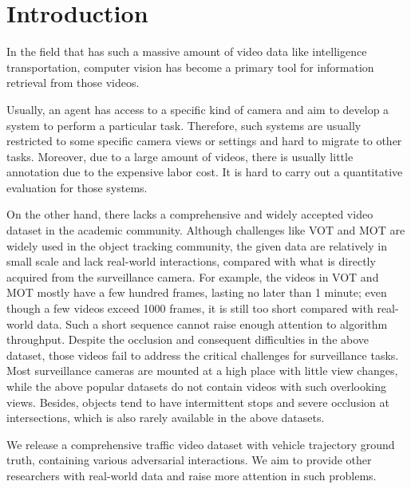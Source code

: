 \section{Introduction}

In the field that has such a massive amount of video data like intelligence transportation, computer vision has become a primary tool for information retrieval from those videos.

Usually, an agent has access to a specific kind of camera and aim to develop a system to perform a particular task.
Therefore, such systems are usually restricted to some specific camera views or settings and hard to migrate to other tasks.
Moreover, due to a large amount of videos, there is usually little annotation due to the expensive labor cost. 
It is hard to carry out a quantitative evaluation for those systems.

On the other hand, there lacks a comprehensive and widely accepted video dataset in the academic community.
Although challenges like VOT \cite{kristan2017visual} and MOT \cite{milan2016mot16} are widely used in the object tracking community, the given data are relatively in small scale and lack real-world interactions, compared with what is directly acquired from the surveillance camera.
For example, the videos in VOT and MOT mostly have a few hundred frames, lasting no later than 1 minute; even though a few videos exceed 1000 frames, it is still too short compared with real-world data.
Such a short sequence cannot raise enough attention to algorithm throughput.
Despite the occlusion and consequent difficulties in the above dataset, those videos fail to address the critical challenges for surveillance tasks.
Most surveillance cameras are mounted at a high place with little view changes, while the above popular datasets do not contain videos with such overlooking views. 
Besides, objects tend to have intermittent stops and severe occlusion at intersections, which is also rarely available in the above datasets. 

We release a comprehensive traffic video dataset with vehicle trajectory ground truth, containing various adversarial interactions. 
We aim to provide other researchers with real-world data and raise more attention in such problems.